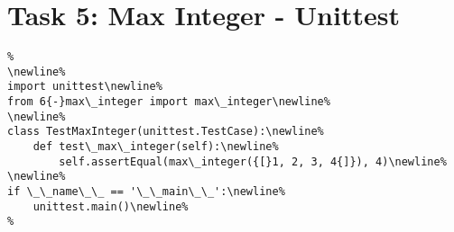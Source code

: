 \documentclass{article}%
\begin{document}
%
\section*{Task 5: Max Integer {-} Unittest}%
\label{sec:Task5MaxInteger{-}Unittest}%
\begin{verbatim}%
\newline%
import unittest\newline%
from 6{-}max\_integer import max\_integer\newline%
\newline%
class TestMaxInteger(unittest.TestCase):\newline%
    def test\_max\_integer(self):\newline%
        self.assertEqual(max\_integer({[}1, 2, 3, 4{]}), 4)\newline%
\newline%
if \_\_name\_\_ == '\_\_main\_\_':\newline%
    unittest.main()\newline%
%
\end{verbatim}

%
\end{document}
